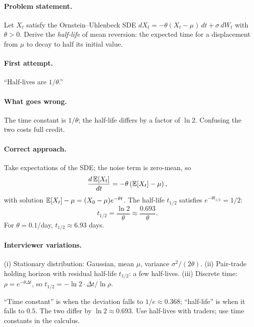 \paragraph{Problem statement.}
Let $X_t$ satisfy the Ornstein--Uhlenbeck SDE
$dX_t = -\theta (X_t - \mu)\,dt + \sigma\,dW_t$ with
$\theta > 0$.  Derive the \emph{half-life} of mean reversion:
the expected time for a displacement from $\mu$ to decay to half
its initial value.

\paragraph{First attempt.}
``Half-lives are $1/\theta$.''

\paragraph{What goes wrong.}
The time constant is $1/\theta$; the half-life differs by a
factor of $\ln 2$.  Confusing the two costs full credit.

\paragraph{Correct approach.}
Take expectations of the SDE; the noise term is zero-mean, so
\[
\frac{d\,\mathbb{E}[X_t]}{dt}
= -\theta \left(\mathbb{E}[X_t] - \mu\right),
\]
with solution $\mathbb{E}[X_t] - \mu = (X_0 - \mu) e^{-\theta t}$.  The
half-life $t_{1/2}$ satisfies $e^{-\theta t_{1/2}} = 1/2$:
\[
t_{1/2} = \frac{\ln 2}{\theta} \approx \frac{0.693}{\theta}.
\]
For $\theta = 0.1$/day, $t_{1/2} \approx 6.93$ days.

\paragraph{Interviewer variations.}
(i) Stationary distribution: Gaussian, mean $\mu$, variance
$\sigma^2/(2\theta)$.  (ii) Pair-trade holding horizon with
residual half-life $t_{1/2}$: a few half-lives.  (iii) Discrete
time: $\rho = e^{-\theta \Delta t}$, so $t_{1/2} = -\ln 2 \cdot
\Delta t / \ln \rho$.

\begin{intuitionbox}
``Time constant'' is when the deviation falls to $1/e \approx
0.368$; ``half-life'' is when it falls to $0.5$.  The two differ
by $\ln 2 \approx 0.693$.  Use half-lives with traders; use time
constants in the calculus.
\end{intuitionbox}

